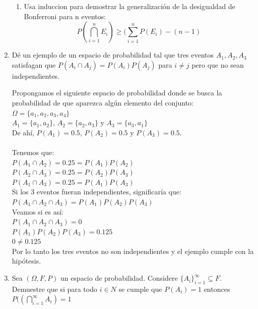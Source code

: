 \documentclass[12pt,a4paper]{report}
\begin{document}
\begin{enumerate}
{\begin{enumerate}[label=\alph*) ]
   \item {
 Usa induccion para demostrar la generalización de la desigualdad de Bonferroni para n eventos:\\
 $$P(\bigcap\limits_{i=1}^{n} E_{i}) \geq (\sum_{i=1}^{n} P(E_{i})-(n-1)$$

   }




	\end{enumerate}
	}

  \item{
  Dé un ejemplo de un espacio de probabilidad tal que tres eventos $A_{1},A_{2},A_{3}$ satisfagan que $P(A_{i} \cap A_{j})=P(A_{i})P(A_{j})$ para $i\neq j$ pero que no sean independientes.
  
  Propongamos el siguiente espacio de probabilidad donde se busca la probabilidad de que aparezca algún elemento del conjunto:\\
  $\Omega = \lbrace a_{1}, a_{2}, a_{3}, a_{4} \rbrace$\\
  $A_{1} = \lbrace a_{1}, a_{2} \rbrace$, $A_{2} = \lbrace a_{2}, a_{3} \rbrace$ y $A_{3} =  \lbrace a_{3}, a_{1} \rbrace$\\
  De ahí, $P(A_{1}) = 0.5$, $P(A_{2}) = 0.5$ y $P(A_{3}) = 0.5$.\\\\
  Tenemos que:\\
  $P(A_{1} \cap A_{2}) = 0.25 = P(A_{1})P(A_{2})$\\
  $P(A_{2} \cap A_{3}) = 0.25 = P(A_{2})P(A_{3})$\\
  $P(A_{1} \cap A_{3}) = 0.25 = P(A_{1})P(A_{3})$\\
  
  Si los 3 eventos fueran independientes, significaría que: \\$P(A_{1} \cap A_{2} \cap A_{3}) = P(A_{1})P(A_{2})P(A_{3})$\\  
  Veamos si es así:\\
  $P(A_{1} \cap A_{2} \cap A_{3}) = 0$\\
  $P(A_{1})P(A_{2})P(A_{3}) = 0.125$\\
  $ 0  \neq 0.125$ \\
  Por lo tanto los tres eventos no son independientes y el ejemplo cumple con la hipótesis.\\ 
  }


  \item{
 Sea $(\Omega, F, P)$ un espacio de probabilidad. Considere $\lbrace A_{i} \rbrace_{i=1}^{\infty} \subseteq F$. Demuestre que si para todo $i \in N$ se cumple que $P(A_{i})=1$ entonces $P((\bigcap\limits_{i=1}^{\infty}A_{i})=1$
  
}
\end{enumerate}
\end{document}
